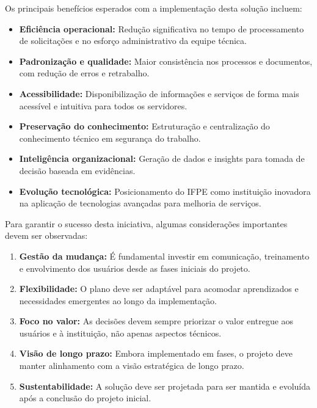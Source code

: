 \documentclass[12pt,a4paper]{article}
\begin{document}
Os principais benefícios esperados com a implementação desta solução incluem:

\begin{itemize}
    \item \textbf{Eficiência operacional:} Redução significativa no tempo de processamento de solicitações e no esforço administrativo da equipe técnica.
    
    \item \textbf{Padronização e qualidade:} Maior consistência nos processos e documentos, com redução de erros e retrabalho.
    
    \item \textbf{Acessibilidade:} Disponibilização de informações e serviços de forma mais acessível e intuitiva para todos os servidores.
    
    \item \textbf{Preservação do conhecimento:} Estruturação e centralização do conhecimento técnico em segurança do trabalho.
    
    \item \textbf{Inteligência organizacional:} Geração de dados e insights para tomada de decisão baseada em evidências.
    
    \item \textbf{Evolução tecnológica:} Posicionamento do IFPE como instituição inovadora na aplicação de tecnologias avançadas para melhoria de serviços.
\end{itemize}

Para garantir o sucesso desta iniciativa, algumas considerações importantes devem ser observadas:

\begin{enumerate}
    \item \textbf{Gestão da mudança:} É fundamental investir em comunicação, treinamento e envolvimento dos usuários desde as fases iniciais do projeto.
    
    \item \textbf{Flexibilidade:} O plano deve ser adaptável para acomodar aprendizados e necessidades emergentes ao longo da implementação.
    
    \item \textbf{Foco no valor:} As decisões devem sempre priorizar o valor entregue aos usuários e à instituição, não apenas aspectos técnicos.
    
    \item \textbf{Visão de longo prazo:} Embora implementado em fases, o projeto deve manter alinhamento com a visão estratégica de longo prazo.
    
    \item \textbf{Sustentabilidade:} A solução deve ser projetada para ser mantida e evoluída após a conclusão do projeto inicial.
\end{enumerate}
\end{document}

